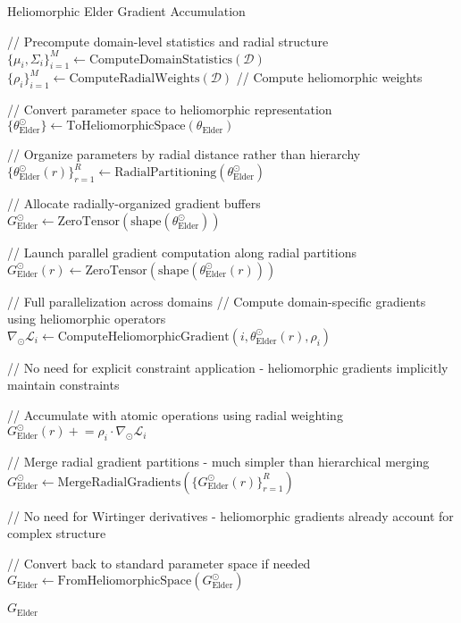 \begin{algorithm}
\caption{Heliomorphic Elder Gradient Accumulation}
\begin{algorithmic}[1]
    \State // Precompute domain-level statistics and radial structure
    \State $\{\mu_i, \Sigma_i\}_{i=1}^M \gets \text{ComputeDomainStatistics}(\mathcal{D})$
    \State $\{\rho_i\}_{i=1}^M \gets \text{ComputeRadialWeights}(\mathcal{D})$ // Compute heliomorphic weights
    
    \State // Convert parameter space to heliomorphic representation
    \State $\{\theta_{\text{Elder}}^{\odot}\} \gets \text{ToHeliomorphicSpace}(\theta_{\text{Elder}})$
    
    \State // Organize parameters by radial distance rather than hierarchy
    \State $\{\theta_{\text{Elder}}^{\odot}(r)\}_{r=1}^R \gets \text{RadialPartitioning}(\theta_{\text{Elder}}^{\odot})$
    
    \State // Allocate radially-organized gradient buffers
    \State $G_{\text{Elder}}^{\odot} \gets \text{ZeroTensor}(\text{shape}(\theta_{\text{Elder}}^{\odot}))$
    
    \State // Launch parallel gradient computation along radial partitions
        \State $G_{\text{Elder}}^{\odot}(r) \gets \text{ZeroTensor}(\text{shape}(\theta_{\text{Elder}}^{\odot}(r)))$
        
         // Full parallelization across domains
            \State // Compute domain-specific gradients using heliomorphic operators
            \State $\nabla_{\odot} \mathcal{L}_i \gets \text{ComputeHeliomorphicGradient}(i, \theta_{\text{Elder}}^{\odot}(r), \rho_i)$
            
            \State // No need for explicit constraint application - heliomorphic gradients implicitly maintain constraints
            
            \State // Accumulate with atomic operations using radial weighting
            \State $G_{\text{Elder}}^{\odot}(r) \mathrel{+}= \rho_i \cdot \nabla_{\odot} \mathcal{L}_i$
        \EndFor
    \EndFor
    
    \State // Merge radial gradient partitions - much simpler than hierarchical merging
    \State $G_{\text{Elder}}^{\odot} \gets \text{MergeRadialGradients}(\{G_{\text{Elder}}^{\odot}(r)\}_{r=1}^R)$
    
    \State // No need for Wirtinger derivatives - heliomorphic gradients already account for complex structure
    
    \State // Convert back to standard parameter space if needed
    \State $G_{\text{Elder}} \gets \text{FromHeliomorphicSpace}(G_{\text{Elder}}^{\odot})$
    
    \State \Return $G_{\text{Elder}}$
\EndFunction
\end{algorithmic}
\end{algorithm}

